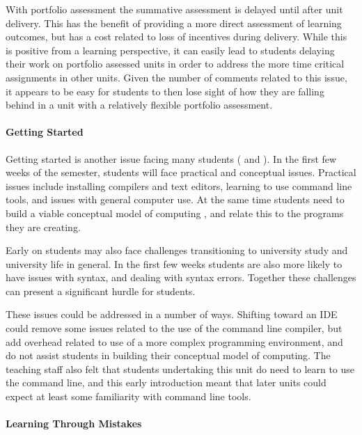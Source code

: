 With portfolio assessment the summative assessment is delayed until after unit delivery. This has the benefit of providing a more direct assessment of learning outcomes, but has a cost related to loss of incentives during delivery. While this is positive from a learning perspective, it can easily lead to students delaying their work on portfolio assessed units in order to address the more time critical assignments in other units. Given the number of comments related to this issue, it appears to be easy for students to then lose sight of how they are falling behind in a unit with a relatively flexible portfolio assessment.


\paragraph{Getting Started} %
\label{ssub:getting_started}

Getting started is another issue facing many students ( and ). In the first few weeks of the semester, students will face practical and conceptual issues. Practical issues include installing compilers and text editors, learning to use command line tools, and issues with general computer use. At the same time students need to build a viable conceptual model of computing \cite{Hoc:1990}, and relate this to the programs they are creating. 

Early on students may also face challenges transitioning to university study and university life in general. In the first few weeks students are also more likely to have issues with syntax, and dealing with syntax errors. Together these challenges can present a significant hurdle for students.

These issues could be addressed in a number of ways. Shifting toward an IDE could remove some issues related to the use of the command line compiler, but add overhead related to use of a more complex programming environment, and do not assist students in building their conceptual model of computing. The teaching staff also felt that students undertaking this unit do need to learn to use the command line, and this early introduction meant that later units could expect at least some familiarity with command line tools.


\paragraph{Learning Through Mistakes} %
\label{ssub:learning_through_mistakes}

